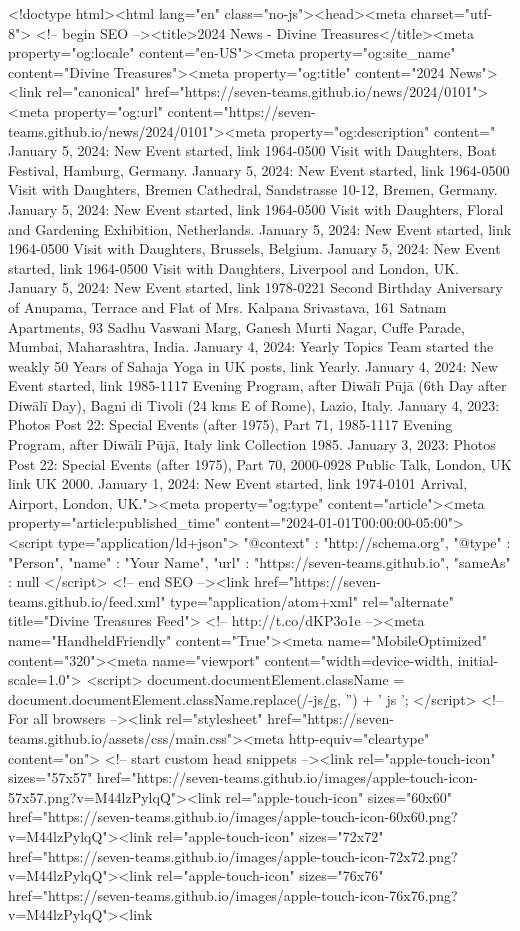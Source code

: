 <!doctype html><html lang="en" class="no-js"><head><meta charset="utf-8"> <!-- begin SEO --><title>2024 News - Divine Treasures</title><meta property="og:locale" content="en-US"><meta property="og:site_name" content="Divine Treasures"><meta property="og:title" content="2024 News"><link rel="canonical" href="https://seven-teams.github.io/news/2024/0101"><meta property="og:url" content="https://seven-teams.github.io/news/2024/0101"><meta property="og:description" content=" January 5, 2024: New Event started, link 1964-0500 Visit with Daughters, Boat Festival, Hamburg, Germany. January 5, 2024: New Event started, link 1964-0500 Visit with Daughters, Bremen Cathedral, Sandstrasse 10-12, Bremen, Germany. January 5, 2024: New Event started, link 1964-0500 Visit with Daughters, Floral and Gardening Exhibition, Netherlands. January 5, 2024: New Event started, link 1964-0500 Visit with Daughters, Brussels, Belgium. January 5, 2024: New Event started, link 1964-0500 Visit with Daughters, Liverpool and London, UK. January 5, 2024: New Event started, link 1978-0221 Second Birthday Aniversary of Anupama, Terrace and Flat of Mrs. Kalpana Srivastava, 161 Satnam Apartments, 93 Sadhu Vaswani Marg, Ganesh Murti Nagar, Cuffe Parade, Mumbai, Maharashtra, India. January 4, 2024: Yearly Topics Team started the weakly 50 Years of Sahaja Yoga in UK posts, link Yearly. January 4, 2024: New Event started, link 1985-1117 Evening Program, after Diwālī Pūjā (6th Day after Diwālī Day), Bagni di Tivoli (24 kms E of Rome), Lazio, Italy. January 4, 2023: Photos Post 22: Special Events (after 1975), Part 71, 1985-1117 Evening Program, after Diwālī Pūjā, Italy link Collection 1985. January 3, 2023: Photos Post 22: Special Events (after 1975), Part 70, 2000-0928 Public Talk, London, UK link UK 2000. January 1, 2024: New Event started, link 1974-0101 Arrival, Airport, London, UK."><meta property="og:type" content="article"><meta property="article:published_time" content="2024-01-01T00:00:00-05:00"> <script type="application/ld+json"> { "@context" : "http://schema.org", "@type" : "Person", "name" : "Your Name", "url" : "https://seven-teams.github.io", "sameAs" : null } </script> <!-- end SEO --><link href="https://seven-teams.github.io/feed.xml" type="application/atom+xml" rel="alternate" title="Divine Treasures Feed"> <!-- http://t.co/dKP3o1e --><meta name="HandheldFriendly" content="True"><meta name="MobileOptimized" content="320"><meta name="viewport" content="width=device-width, initial-scale=1.0"> <script> document.documentElement.className = document.documentElement.className.replace(/\bno-js\b/g, '') + ' js '; </script> <!-- For all browsers --><link rel="stylesheet" href="https://seven-teams.github.io/assets/css/main.css"><meta http-equiv="cleartype" content="on"> <!-- start custom head snippets --><link rel="apple-touch-icon" sizes="57x57" href="https://seven-teams.github.io/images/apple-touch-icon-57x57.png?v=M44lzPylqQ"><link rel="apple-touch-icon" sizes="60x60" href="https://seven-teams.github.io/images/apple-touch-icon-60x60.png?v=M44lzPylqQ"><link rel="apple-touch-icon" sizes="72x72" href="https://seven-teams.github.io/images/apple-touch-icon-72x72.png?v=M44lzPylqQ"><link rel="apple-touch-icon" sizes="76x76" href="https://seven-teams.github.io/images/apple-touch-icon-76x76.png?v=M44lzPylqQ"><link 